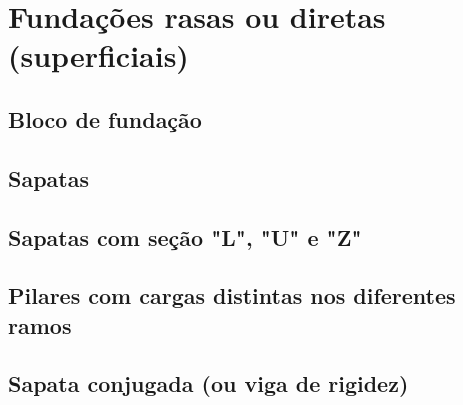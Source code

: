 \documentclass[12pt, a4paper]{article}
\begin{document}
	

	\section{Fundações rasas ou diretas (superficiais)}

		\subsection{Bloco de fundação}
		

		\subsection{Sapatas}
		

		\subsection{Sapatas com seção "L", "U" e "Z"}
		

		\subsection{Pilares com cargas distintas nos diferentes ramos}
		

		\subsection{Sapata conjugada (ou viga de rigidez)}
		
\end{document}
